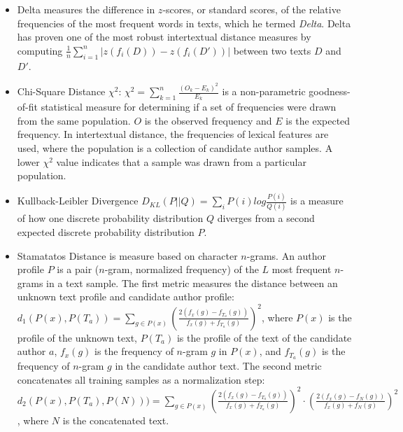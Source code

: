 \begin{itemize}
    \item Delta measures the difference in $z$-scores, or standard scores, of the relative frequencies of the most frequent words in texts, which he termed \textit{Delta}. 
    Delta has proven one of the most robust intertextual distance measures by computing 
    $\frac{1}{n}\sum_{i=1}^{n} \left| z(f_i(D)) - z(f_i(D')) \right|$ between two texts $D$ and $D'$.
    \item Chi-Square Distance $\chi^2$: $\chi^2=\sum_{k=1}^{n}\frac{(O_k-E_k)^2}{E_k}$ is a non-parametric goodness-of-fit statistical measure for determining
    if a set of frequencies were drawn from the same population.
    $O$ is the observed frequency and $E$ is the expected frequency.
    In intertextual distance, the frequencies of lexical features are used, where the population is a collection of candidate author samples.
    A lower $\chi^2$ value indicates that a sample was drawn from a particular population.
    \item Kullback-Leibler Divergence $D_{KL}(P||Q)=\sum_{i}P(i) log \frac{P(i)}{Q(i)}$ 
    is a measure of how one discrete probability distribution $Q$ diverges from a second expected discrete probability distribution $P$.
    \item Stamatatos Distance is measure based on character $n$-grams.
    An author profile $P$ is a pair ($n$-gram, normalized frequency) of the $L$ most frequent $n$-grams in a text sample.
    The first metric measures the distance between an unknown text profile and candidate author profile: 
    $d_1(P(x),P(T_a))=\sum_{g \in P(x)} (\frac{2(f_x(g)-f_{T_a}(g))}{f_x(g)+ f_{T_a}(g)})^2$, 
    where $P(x)$ is the profile of the unknown text, $P(T_a)$ is the profile of the text of the candidate author $a$, 
    $f_x(g)$ is the frequency of $n$-gram $g$ in $P(x)$, and $f_{T_a}(g)$ is the frequency of $n$-gram $g$ in the candidate author text.
    The second metric concatenates all training samples as a normalization step:
    $d_2(P(x),P(T_a),P(N)))=\sum_{g \in P(x)} (\frac{2(f_x(g)-f_{T_a}(g))}{f_x(g)+ f_{T_a}(g)})^2 \cdot (\frac{2(f_x(g)-f_N(g))}{f_x(g)+ f_N(g)})^2$, 
    where $N$ is the concatenated text.

\end{itemize}

